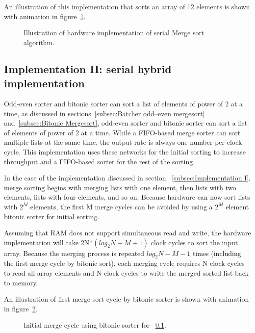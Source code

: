 \documentclass{article}
\begin{document}
An illustration of this implementation that sorts an array of 12 elements is shown with animation in figure~\ref{fig:address_serial}.

\begin{figure}[H]
\centering
\caption{\label{fig:address_serial}Illustration of hardware implementation of serial Merge sort algorithm.}
\end{figure}


\subsection{Implementation II: serial hybrid implementation}
\label{subsec:Implementation II}
Odd-even sorter and bitonic sorter can sort a list of elements of power of 2 at a time, as discussed in sections~\ref{subsec:Batcher odd–even mergesort} and~\ref{subsec:Bitonic Mergesort}, odd-even sorter and bitonic sorter can sort a list of elements of power of 2 at a time. While a FIFO-based merge sorter can sort multiple lists at the same time, the output rate is always one number per clock cycle. This implementation uses these networks for the initial sorting to increase throughput and a FIFO-based sorter for the rest of the sorting.
 
In the case of the implementation discussed in section ~\ref{subsec:Implementation I}, merge sorting begins with merging lists with one element, then lists with two elements, lists with four elements, and so on. Because hardware can now sort lists with $2^M$ elements, the first M merge cycles can be avoided by using a $2^M$ element bitonic sorter for initial sorting. 

Assuming that RAM does not support simultaneous read and write, the hardware implementation will take 2N*$(log_2N-M+1)$ clock cycles to sort the input array. Because the merging process is repeated $log_2N-M-1$ times (including the first merge cycle by bitonic sort), each merging cycle requires N clock cycles to read all array elements and N clock cycles to write the merged sorted list back to memory.

An illustration of first merge sort cycle by bitonic sorter is shown with animation in figure~\ref{fig:serial}.

\begin{figure}
\centering

\caption{\label{fig:serial}Initial merge cycle using bitonic sorter for ~\ref{subsec:Implementation II}.}
\end{figure}
\end{document}
